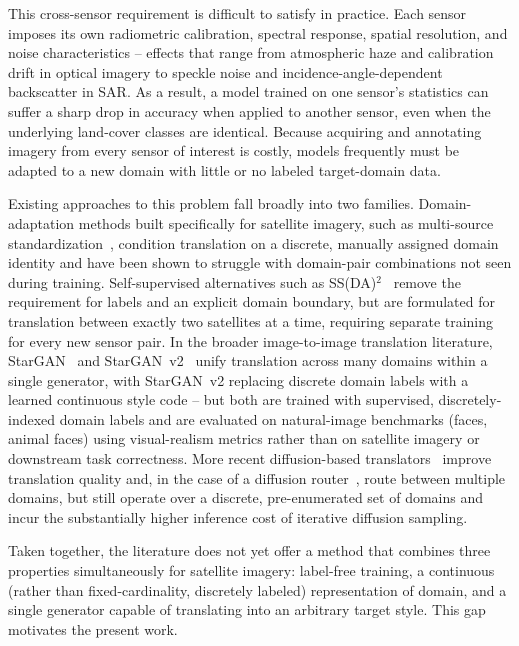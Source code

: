 \documentclass[runningheads]{llncs}
\begin{document}
This cross-sensor requirement is difficult to satisfy in practice. Each sensor imposes its own radiometric calibration, spectral response, spatial resolution, and noise characteristics -- effects that range from atmospheric haze and calibration drift in optical imagery to speckle noise and incidence-angle-dependent backscatter in SAR. As a result, a model trained on one sensor's statistics can suffer a sharp drop in accuracy when applied to another sensor, even when the underlying land-cover classes are identical. Because acquiring and annotating imagery from every sensor of interest is costly, models frequently must be adapted to a new domain with little or no labeled target-domain data.

Existing approaches to this problem fall broadly into two families. Domain-adaptation methods built specifically for satellite imagery, such as multi-source standardization~\cite{tasar2020standardgan}, condition translation on a discrete, manually assigned domain identity and have been shown to struggle with domain-pair combinations not seen during training. Self-supervised alternatives such as SS(DA)$^2$~\cite{zhang2023ssdada} remove the requirement for labels and an explicit domain boundary, but are formulated for translation between exactly two satellites at a time, requiring separate training for every new sensor pair. In the broader image-to-image translation literature, StarGAN~\cite{choi2018stargan} and StarGAN~v2~\cite{choi2020starganv2} unify translation across many domains within a single generator, with StarGAN~v2 replacing discrete domain labels with a learned continuous style code -- but both are trained with supervised, discretely-indexed domain labels and are evaluated on natural-image benchmarks (faces, animal faces) using visual-realism metrics rather than on satellite imagery or downstream task correctness. More recent diffusion-based translators~\cite{vinholi2024multisensor,kieu2025universal} improve translation quality and, in the case of a diffusion router~\cite{kieu2025universal}, route between multiple domains, but still operate over a discrete, pre-enumerated set of domains and incur the substantially higher inference cost of iterative diffusion sampling.

Taken together, the literature does not yet offer a method that combines three properties simultaneously for satellite imagery: label-free training, a continuous (rather than fixed-cardinality, discretely labeled) representation of domain, and a single generator capable of translating into an arbitrary target style. This gap motivates the present work.
\end{document}
